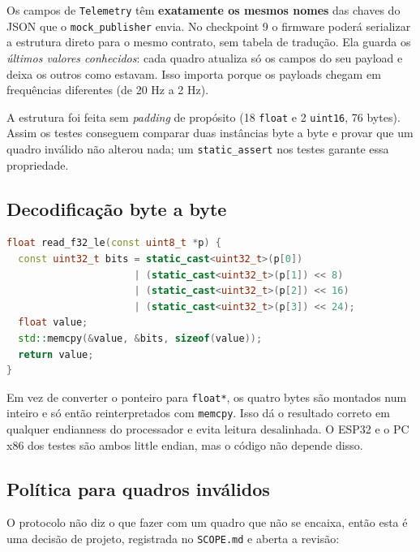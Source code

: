\documentclass[11pt,a4paper]{article}
\begin{document}
Os campos de \texttt{Telemetry} têm \textbf{exatamente os mesmos nomes} das chaves do JSON que o \texttt{mock\_publisher} envia. No checkpoint 9 o firmware poderá serializar a estrutura direto para o mesmo contrato, sem tabela de tradução. Ela guarda os \emph{últimos valores conhecidos}: cada quadro atualiza só os campos do seu payload e deixa os outros como estavam. Isso importa porque os payloads chegam em frequências diferentes (de 20 Hz a 2 Hz).

A estrutura foi feita sem \emph{padding} de propósito (18 \texttt{float} e 2 \texttt{uint16}, 76 bytes). Assim os testes conseguem comparar duas instâncias byte a byte e provar que um quadro inválido não alterou nada; um \texttt{static\_assert} nos testes garante essa propriedade.

\subsection{Decodificação byte a byte}

\begin{lstlisting}[language=C++,caption={Leitura de um float little endian}]
float read_f32_le(const uint8_t *p) {
  const uint32_t bits = static_cast<uint32_t>(p[0])
                      | (static_cast<uint32_t>(p[1]) << 8)
                      | (static_cast<uint32_t>(p[2]) << 16)
                      | (static_cast<uint32_t>(p[3]) << 24);
  float value;
  std::memcpy(&value, &bits, sizeof(value));
  return value;
}
\end{lstlisting}

Em vez de converter o ponteiro para \texttt{float*}, os quatro bytes são montados num inteiro e só então reinterpretados com \texttt{memcpy}. Isso dá o resultado correto em qualquer endianness do processador e evita leitura desalinhada. O ESP32 e o PC x86 dos testes são ambos little endian, mas o código não depende disso.

\subsection{Política para quadros inválidos}

O protocolo não diz o que fazer com um quadro que não se encaixa, então esta é uma decisão de projeto, registrada no \texttt{SCOPE.md} e aberta a revisão:
\end{document}
